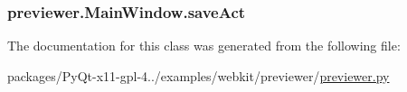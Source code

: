 \subsubsection[{save\+Act}]{\setlength{\rightskip}{0pt plus 5cm}previewer.\+Main\+Window.\+save\+Act}\label{classpreviewer_1_1MainWindow_a7215c6e7ffa58d6a2b57b0a11676c89b}


The documentation for this class was generated from the following file\+:\begin{DoxyCompactItemize}
\item 
packages/\+Py\+Qt-\/x11-\/gpl-\/4../examples/webkit/previewer/\hyperlink{previewer_8py}{previewer.\+py}\end{DoxyCompactItemize}
